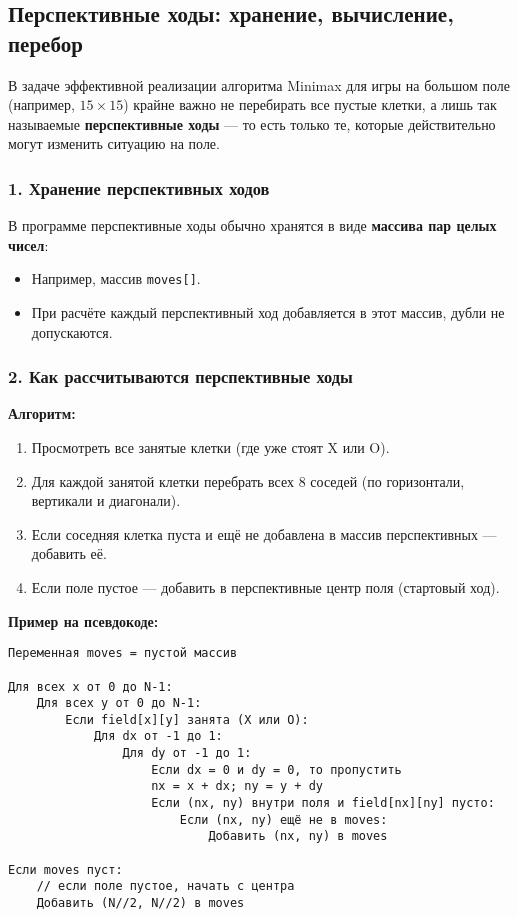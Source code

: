 \subsection{Перспективные ходы: хранение, вычисление, перебор}

В задаче эффективной реализации алгоритма Minimax для игры на большом поле (например, $15 \times 15$) крайне важно не перебирать все пустые клетки, а лишь так называемые \textbf{перспективные ходы} — то есть только те, которые действительно могут изменить ситуацию на поле.

\subsubsection*{1. Хранение перспективных ходов}

В программе перспективные ходы обычно хранятся в виде \textbf{массива пар целых чисел}:

\begin{itemize}
    \item Например, массив \verb|moves[]|.
    \item При расчёте каждый перспективный ход добавляется в этот массив, дубли не допускаются.
\end{itemize}

\subsubsection*{2. Как рассчитываются перспективные ходы}

\textbf{Алгоритм:}
\begin{enumerate}
    \item Просмотреть все занятые клетки (где уже стоят X или O).
    \item Для каждой занятой клетки перебрать всех 8 соседей (по горизонтали, вертикали и диагонали).
    \item Если соседняя клетка пуста и ещё не добавлена в массив перспективных — добавить её.
    \item Если поле пустое — добавить в перспективные центр поля (стартовый ход).
\end{enumerate}

\vspace{0.5em}

\textbf{Пример на псевдокоде:}

\begin{verbatim}
Переменная moves = пустой массив

Для всех x от 0 до N-1:
    Для всех y от 0 до N-1:
        Если field[x][y] занята (X или O):
            Для dx от -1 до 1:
                Для dy от -1 до 1:
                    Если dx = 0 и dy = 0, то пропустить
                    nx = x + dx; ny = y + dy
                    Если (nx, ny) внутри поля и field[nx][ny] пусто:
                        Если (nx, ny) ещё не в moves:
                            Добавить (nx, ny) в moves

Если moves пуст:
    // если поле пустое, начать с центра
    Добавить (N//2, N//2) в moves 
\end{verbatim}


